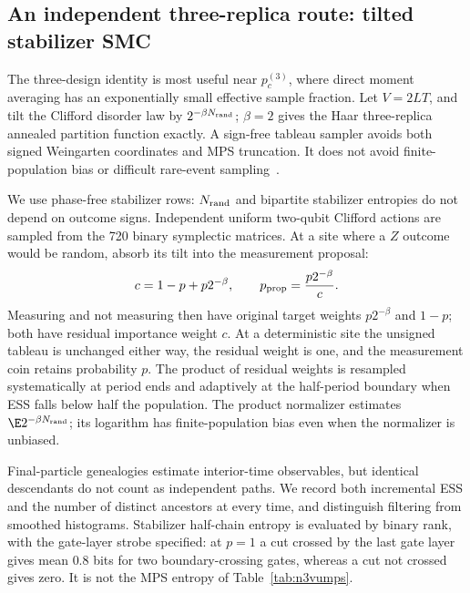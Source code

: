 \subsection{An independent three-replica route: tilted stabilizer SMC}
\label{sec:coexistence-smc}

The three-design identity is most useful near $p_c^{(3)}$, where direct moment averaging has an exponentially small effective sample fraction. Let $V=2LT$, and tilt the Clifford disorder law by $2^{-\beta N_{\rm rand}}$; $\beta=2$ gives the Haar three-replica annealed partition function exactly. A sign-free tableau sampler avoids both signed Weingarten coordinates and MPS truncation. It does not avoid finite-population bias or difficult rare-event sampling~\cite{Giardina2006,DelMoral2004}.

We use phase-free stabilizer rows: $N_{\rm rand}$ and bipartite stabilizer entropies do not depend on outcome signs. Independent uniform two-qubit Clifford actions are sampled from the 720 binary symplectic matrices. At a site where a $Z$ outcome would be random, absorb its tilt into the measurement proposal:
\begin{equation}
 c=1-p+p2^{-\beta},\qquad
 p_{\rm prop}=\frac{p2^{-\beta}}{c}.
 \label{eq:adapted-tilt}
\end{equation}
Measuring and not measuring then have original target weights $p2^{-\beta}$ and $1-p$; both have residual importance weight $c$. At a deterministic site the unsigned tableau is unchanged either way, the residual weight is one, and the measurement coin retains probability $p$. The product of residual weights is resampled systematically at period ends and adaptively at the half-period boundary when ESS falls below half the population. The product normalizer estimates $\E 2^{-\beta N_{\rm rand}}$; its logarithm has finite-population bias even when the normalizer is unbiased.

Final-particle genealogies estimate interior-time observables, but identical descendants do not count as independent paths. We record both incremental ESS and the number of distinct ancestors at every time, and distinguish filtering from smoothed histograms. Stabilizer half-chain entropy is evaluated by binary rank, with the gate-layer strobe specified: at $p=1$ a cut crossed by the last gate layer gives mean $0.8$ bits for two boundary-crossing gates, whereas a cut not crossed gives zero. It is not the MPS entropy of Table~\ref{tab:n3vumps}.

